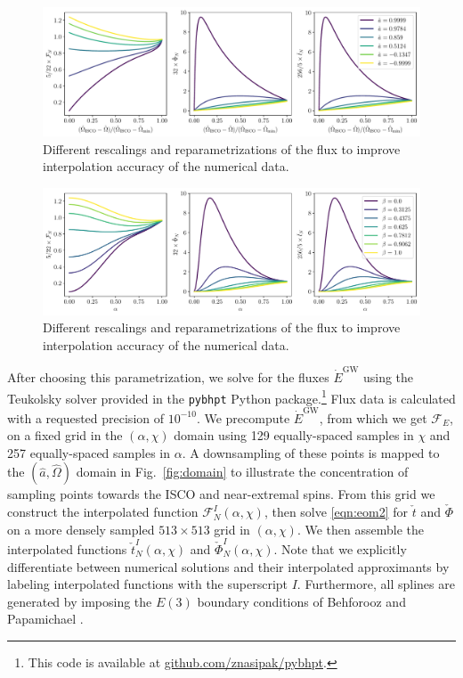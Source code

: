 \documentclass[%
 reprint,
 nofootinbib,
 amsmath,amssymb,
 aps,
 prd,
]{revtex4-2}
\begin{document}
\begin{figure}[!htp]
    \centering
    \includegraphics[width=0.98\linewidth]{figures/rescaled_parametrization.pdf}
    \caption{Different rescalings and reparametrizations of the flux to improve interpolation accuracy of the numerical data.}
    \label{fig:rescaled}
\end{figure}

\begin{figure}[!htp]
    \centering
    \includegraphics[width=0.98\linewidth]{figures/final_parametrization.pdf}
    \caption{Different rescalings and reparametrizations of the flux to improve interpolation accuracy of the numerical data.}
    \label{fig:final}
\end{figure}

After choosing this parametrization, we solve for the fluxes $\dot{E}^\mathrm{GW}$ using the Teukolsky solver provided in the \texttt{pybhpt} Python package.\footnote{This code is available at \href{https://github.com/znasipak/pybhpt}{github.com/znasipak/pybhpt}.} Flux data is calculated with a requested precision of $10^{-10}$. We precompute $\dot{E}^\mathrm{GW}$, from which we get $\mathcal{F}_E$, on a fixed grid in the $(\alpha, \chi)$ domain using 129 equally-spaced samples in $\chi$ and 257 equally-spaced samples in $\alpha$. A downsampling of these points is mapped to the $(\hat{a}, \hat{\Omega})$ domain in Fig.~\ref{fig:domain} to illustrate the concentration of sampling points towards the ISCO and near-extremal spins. From this grid we construct the interpolated function $\mathcal{F}_N^I(\alpha, \chi)$, then solve \eqref{eqn:eom2} for $\check{t}$ and $\check{\Phi}$ on a more densely sampled $513 \times 513$ grid in $(\alpha, \chi)$. We then assemble the interpolated functions $\check{t}^I_{N}(\alpha, \chi)$ and $\check{\Phi}^I_{N}(\alpha, \chi)$. Note that we explicitly differentiate between numerical solutions and their interpolated approximants by labeling interpolated functions with the superscript $I$. Furthermore, all splines are generated by imposing the $E(3)$ boundary conditions of Behforooz and Papamichael \cite{BehfPapa79, Behf95}. 
\end{document}
